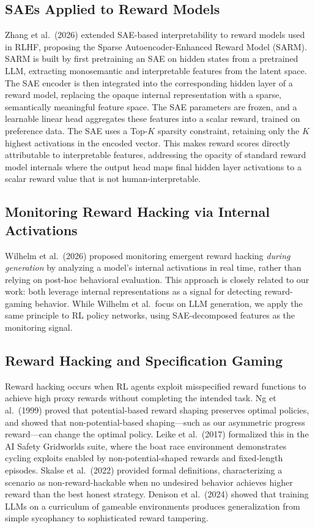 \documentclass[11pt]{article}
\begin{document}
\subsection{SAEs Applied to Reward Models}

Zhang et al.\ (2026) extended SAE-based interpretability to reward models used in RLHF, proposing the Sparse Autoencoder-Enhanced Reward Model (SARM).  SARM is built by first pretraining an SAE on hidden states from a pretrained LLM, extracting monosemantic and interpretable features from the latent space.  The SAE encoder is then integrated into the corresponding hidden layer of a reward model, replacing the opaque internal representation with a sparse, semantically meaningful feature space.  The SAE parameters are frozen, and a learnable linear head aggregates these features into a scalar reward, trained on preference data.  The SAE uses a Top-$K$ sparsity constraint, retaining only the $K$ highest activations in the encoded vector.  This makes reward scores directly attributable to interpretable features, addressing the opacity of standard reward model internals where the output head maps final hidden layer activations to a scalar reward value that is not human-interpretable.

\subsection{Monitoring Reward Hacking via Internal Activations}

Wilhelm et al.\ (2026) proposed monitoring emergent reward hacking \emph{during generation} by analyzing a model's internal activations in real time, rather than relying on post-hoc behavioral evaluation.  This approach is closely related to our work: both leverage internal representations as a signal for detecting reward-gaming behavior.  While Wilhelm et al.\ focus on LLM generation, we apply the same principle to RL policy networks, using SAE-decomposed features as the monitoring signal.

\subsection{Reward Hacking and Specification Gaming}

Reward hacking occurs when RL agents exploit misspecified reward functions to achieve high proxy rewards without completing the intended task.  Ng et al.\ (1999) proved that potential-based reward shaping preserves optimal policies, and showed that non-potential-based shaping---such as our asymmetric progress reward---can change the optimal policy.  Leike et al.\ (2017) formalized this in the AI Safety Gridworlds suite, where the boat race environment demonstrates cycling exploits enabled by non-potential-shaped rewards and fixed-length episodes.  Skalse et al.\ (2022) provided formal definitions, characterizing a scenario as non-reward-hackable when no undesired behavior achieves higher reward than the best honest strategy.  Denison et al.\ (2024) showed that training LLMs on a curriculum of gameable environments produces generalization from simple sycophancy to sophisticated reward tampering.
\end{document}
